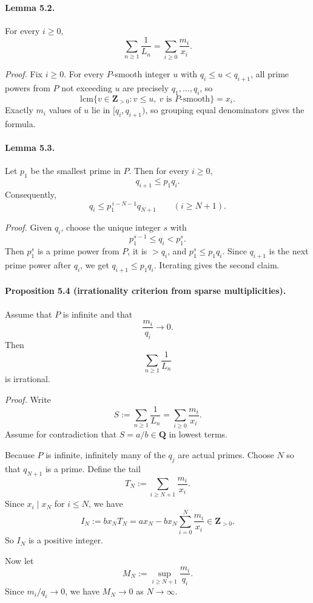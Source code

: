 \paragraph{Lemma 5.2.}
For every $i\ge 0$,
\[
\sum_{n\ge 1}\frac1{L_n}=\sum_{i\ge 0}\frac{m_i}{x_i}.
\]

\emph{Proof.}
Fix $i\ge 0$. For every $P$-smooth integer $u$ with $q_i\le u<q_{i+1}$, all prime powers from $P$ not exceeding $u$ are precisely $q_1,\dots,q_i$, so
\[
\mathrm{lcm}\{v\in\mathbf Z_{>0}: v\le u,\ v\text{ is }P\text{-smooth}\}=x_i.
\]
Exactly $m_i$ values of $u$ lie in $[q_i,q_{i+1})$, so grouping equal denominators gives the formula. 

\paragraph{Lemma 5.3.}
Let $p_1$ be the smallest prime in $P$. Then for every $i\ge 0$,
\[
q_{i+1}\le p_1 q_i.
\]
Consequently,
\[
q_i\le p_1^{\,i-N-1}q_{N+1}\qquad (i\ge N+1).
\]

\emph{Proof.}
Given $q_i$, choose the unique integer $s$ with
\[
p_1^{s-1}\le q_i < p_1^s.
\]
Then $p_1^s$ is a prime power from $P$, it is $>q_i$, and $p_1^s\le p_1 q_i$. Since $q_{i+1}$ is the next prime power after $q_i$, we get $q_{i+1}\le p_1 q_i$. Iterating gives the second claim. 

\paragraph{Proposition 5.4 (irrationality criterion from sparse multiplicities).}
Assume that $P$ is infinite and that
\[
\frac{m_i}{q_i}\to 0.
\]
Then
\[
\sum_{n\ge 1}\frac1{L_n}
\]
is irrational.

\emph{Proof.}
Write
\[
S:=\sum_{n\ge 1}\frac1{L_n}=\sum_{i\ge 0}\frac{m_i}{x_i}.
\]
Assume for contradiction that $S=a/b\in\mathbf Q$ in lowest terms.

Because $P$ is infinite, infinitely many of the $q_j$ are actual primes. Choose $N$ so that $q_{N+1}$ is a prime. Define the tail
\[
T_N:=\sum_{i\ge N+1}\frac{m_i}{x_i}.
\]
Since $x_i\mid x_N$ for $i\le N$, we have
\[
I_N:=b x_N T_N
=
ax_N-bx_N\sum_{i=0}^{N}\frac{m_i}{x_i}
\in \mathbf Z_{>0}.
\]
So $I_N$ is a positive integer.

Now let
\[
M_N:=\sup_{i\ge N+1}\frac{m_i}{q_i}.
\]
Since $m_i/q_i\to 0$, we have $M_N\to 0$ as $N\to\infty$.

